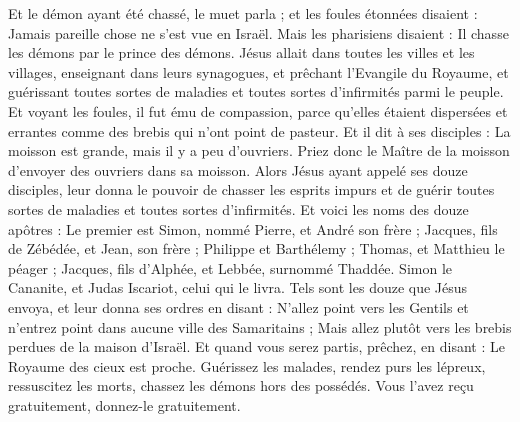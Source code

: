 \begin{multicols}{2}
Et le démon ayant été chassé, le muet parla ; et les foules étonnées disaient : Jamais pareille chose ne s'est vue en Israël.
Mais les pharisiens disaient : Il chasse les démons par le prince des démons.
Jésus allait dans toutes les villes et les villages, enseignant dans leurs synagogues, et prêchant l'Evangile du Royaume, et guérissant toutes sortes de maladies et toutes sortes d'infirmités parmi le peuple.
Et voyant les foules, il fut ému de compassion, parce qu'elles étaient dispersées et errantes comme des brebis qui n'ont point de pasteur.
Et il dit à ses disciples : La moisson est grande, mais il y a peu d'ouvriers.
Priez donc le Maître de la moisson d'envoyer des ouvriers dans sa moisson.
\VerseOne{}Alors Jésus ayant appelé ses douze disciples, leur donna le pouvoir de chasser les esprits impurs et de guérir toutes sortes de maladies et toutes sortes d'infirmités.
Et voici les noms des douze apôtres : Le premier est Simon, nommé Pierre, et André son frère ; Jacques, fils de Zébédée, et Jean, son frère ;
Philippe et Barthélemy ; Thomas, et Matthieu le péager ; Jacques, fils d'Alphée, et Lebbée, surnommé Thaddée.
Simon le Cananite, et Judas Iscariot, celui qui le livra.
Tels sont les douze que Jésus envoya, et leur donna ses ordres en disant : N'allez point vers les Gentils et n'entrez point dans aucune ville des Samaritains ;
Mais allez plutôt vers les brebis perdues de la maison d'Israël.
Et quand vous serez partis, prêchez, en disant : Le Royaume des cieux est proche.
Guérissez les malades, rendez purs les lépreux, ressuscitez les morts, chassez les démons hors des possédés. Vous l'avez reçu gratuitement, donnez-le gratuitement.

\end{multicols}
